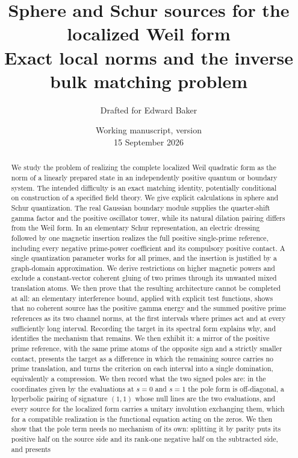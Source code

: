\documentclass[11pt]{article}
\title{Sphere and Schur sources for the localized Weil form\\[5pt]
\large Exact local norms and the inverse bulk matching problem}
\author{Drafted for Edward Baker}
\date{Working manuscript, version \draftversion\\15 September 2026}
\numberwithin{equation}{section}
\theoremstyle{definition}
\theoremstyle{remark}
\begin{document}
\maketitle
\begin{abstract}
We study the problem of realizing the complete localized Weil quadratic
form as the norm of a linearly prepared state in an independently positive
quantum or boundary system. The intended difficulty is an exact matching
identity, potentially conditional on construction of a specified field
theory. We give explicit calculations in sphere and Schur quantization.
The real Gaussian boundary module supplies the quarter-shift gamma factor
and the positive oscillator tower, while its natural dilation pairing
differs from the Weil form. In an elementary Schur representation, an
electric dressing followed by one magnetic insertion realizes the full
positive single-prime reference, including every negative prime-power
coefficient and its compulsory positive contact. A single quantization
parameter works for all primes, and the insertion is justified by a
graph-domain approximation. We derive restrictions on higher magnetic
powers and exclude a constant-vector coherent gluing of two primes through
its unwanted mixed translation atoms. We then prove that the resulting
architecture cannot be completed at all: an elementary interference bound,
applied with explicit test functions, shows that no coherent source has the
positive gamma energy and the summed positive prime references as its two
channel norms, at the first intervals where primes act and at every
sufficiently long interval. Recording the target in its spectral form
explains why, and identifies the mechanism that remains. We then exhibit it:
a mirror of the positive prime reference, with the same prime atoms of the
opposite sign and a strictly smaller contact, presents the target as a
difference in which the remaining source carries no prime translation, and
turns the criterion on each interval into a single domination, equivalently a
compression. We then record what the two signed poles are: in the coordinates
given by the evaluations at $s=0$ and $s=1$ the pole form is off-diagonal, a
hyperbolic pairing of signature $(1,1)$ whose null lines are the two
evaluations, and every source for the localized form carries a unitary
involution exchanging them, which for a compatible realization is the
functional equation acting on the zeros. We then show that the pole term needs
no mechanism of its own: splitting it by parity puts its positive half on the
source side and its rank-one negative half on the subtracted side, and presents

\end{abstract}
\end{document}

